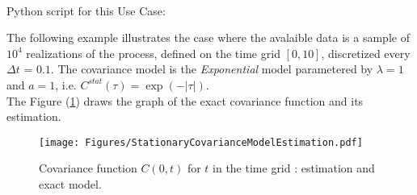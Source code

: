 \textspace\\
Python script for this Use Case:




The following example illustrates the case where the avalaible data is a sample of $10^4$ realizations of the process, defined on the time grid $[0, 10]$, discretized every $\Delta t$ = $0.1$. The  covariance model  is the \textit{Exponential} model parametered by $\lambda = 1$ and $a = 1$, i.e.  $C^{stat}(\tau) = \exp(-|\tau|)$.\\

The Figure (\ref{StationaryCovarianceModelEstimation}) draws the graph of the exact covariance function and its estimation.
\begin{figure}[H]
  \begin{center}
    \texttt{[image: Figures/StationaryCovarianceModelEstimation.pdf]}
    \caption{Covariance function $C(0,t)$ for $t$ in the time grid : estimation and exact model.}
    \label{StationaryCovarianceModelEstimation}
  \end{center}
\end{figure}
